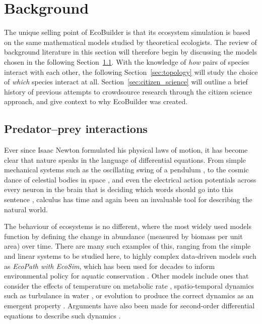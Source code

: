 \section{Background}
\label{sec:joy_background}
The unique selling point of EcoBuilder is that its ecosystem simulation is based on the same mathematical models studied by theoretical ecologists. The review of background literature in this section will therefore begin by discussing the models chosen in the following Section~\ref{sec:predator_prey}. With the knowledge of \emph{how} pairs of species interact with each other, the following Section~\ref{sec:topology} will study the choice of \emph{which} species interact at all. Section~\ref{sec:citizen_science} will outline a brief history of previous attempts to crowdsource research through the citizen science approach, and give context to why EcoBuilder was created.

\subsection{Predator--prey interactions}
\label{sec:predator_prey}
Ever since Isaac Newton formulated his physical laws of motion, it has become clear that nature speaks in the language of differential equations. From simple mechanical systems such as the oscillating swing of a pendulum \citep{Fulcher1976}, to the cosmic dance of celestial bodies in space \citep{Marchal2012}, and even the electrical action potentials across every neuron in the brain that is deciding which words should go into this sentence \citep{Hodgkin1952}, calculus has time and again been an invaluable tool for describing the natural world. 

The behaviour of ecosystems is no different, where the most widely used models function by defining the change in abundance (measured by biomass per unit area) over time.
There are many such examples of this, ranging from the simple and linear systems to be studied here, to highly complex data-driven models such as \emph{EcoPath with EcoSim}, which has been used for decades to inform environmental policy for aquatic conservation \citep{Christensen2004}.
Other models include ones that consider the effects of temperature on metabolic rate \citep{Savage2004, Dell2014}, spatio-temporal dynamics such as turbulance in water \citep{Watteaux2015}, or evolution to produce the correct dynamics as an emergent property \citep{Laird2008}. Arguments have also been made for second-order differential equations to describe such dynamics \citep{Colyvan2003}.

